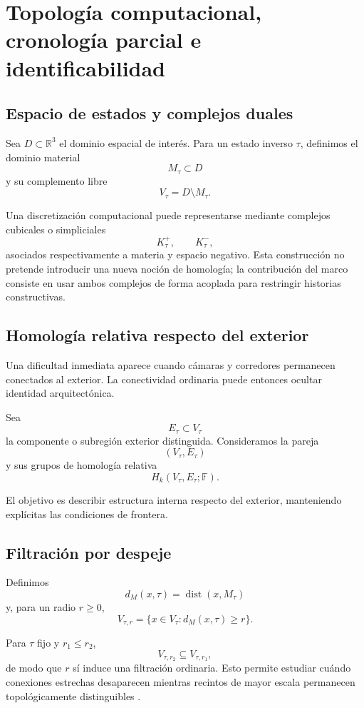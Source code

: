 
\section{Topología computacional, cronología parcial e identificabilidad}

\subsection{Espacio de estados y complejos duales}

Sea \(D\subset\mathbb R^3\) el dominio espacial de interés. Para un estado inverso \(\tau\), definimos el dominio material
\[
M_\tau\subset D
\]
y su complemento libre
\[
V_\tau=D\setminus M_\tau.
\]

Una discretización computacional puede representarse mediante complejos cubicales o simpliciales
\[
K_\tau^+,\qquad K_\tau^-,
\]
asociados respectivamente a materia y espacio negativo. Esta construcción no pretende introducir una nueva noción de homología; la contribución del marco consiste en usar ambos complejos de forma acoplada para restringir historias constructivas.

\subsection{Homología relativa respecto del exterior}

Una dificultad inmediata aparece cuando cámaras y corredores permanecen conectados al exterior. La conectividad ordinaria puede entonces ocultar identidad arquitectónica.

Sea
\[
E_\tau\subset V_\tau
\]
la componente o subregión exterior distinguida. Consideramos la pareja
\[
(V_\tau,E_\tau)
\]
y sus grupos de homología relativa
\[
\boxed{
H_k(V_\tau,E_\tau;\mathbb F).
}
\]

El objetivo es describir estructura interna respecto del exterior, manteniendo explícitas las condiciones de frontera.

\subsection{Filtración por despeje}

Definimos
\[
d_M(x,\tau)
=
\operatorname{dist}(x,M_\tau)
\]
y, para un radio \(r\ge0\),
\[
\boxed{
V_{\tau,r}
=
\{
x\in V_\tau:
d_M(x,\tau)\ge r
\}.
}
\]

Para \(\tau\) fijo y \(r_1\le r_2\),
\[
V_{\tau,r_2}\subseteq V_{\tau,r_1},
\]
de modo que \(r\) sí induce una filtración ordinaria. Esto permite estudiar cuándo conexiones estrechas desaparecen mientras recintos de mayor escala permanecen topológicamente distinguibles \cite{edelsbrunner2010,deywang2022}.

